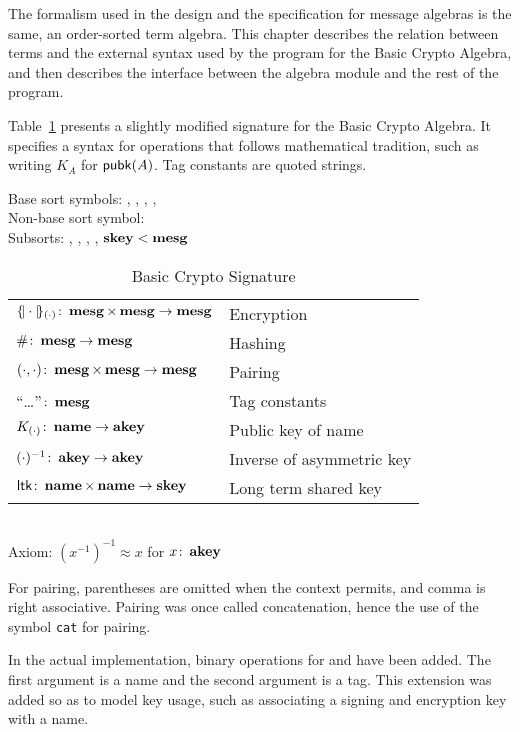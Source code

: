 \documentclass[12pt]{report}
\theoremstyle{definition}
\begin{document}
The formalism used in the design and the specification for message
algebras is the same, an order-sorted term algebra.  This chapter
describes the relation between terms and the external syntax used by
the {\cpsa} program for the Basic Crypto Algebra, and then describes
the interface between the algebra module and the rest of the program.

Table~\ref{tab:bca} presents a slightly modified signature for the
Basic Crypto Algebra.  It specifies a syntax for operations that
follows mathematical tradition, such as writing $K_A$ for
$\operatorname{\mathsf{pubk}}(A)$.  Tag constants are quoted strings.

\begin{table}
\begin{center}
Base sort symbols: , , , ,
\\
Non-base sort symbol:  \\[1ex]
Subsorts: , , , ,
$\operatorname{\mathbf{skey}}<\operatorname{\mathbf{mesg}}$\\[1ex]
\begin{tabular}{@{}ll}
$\{\!|\cdot|\!\}_{(\cdot)}\colon\operatorname{\mathbf{mesg}}\times\operatorname{\mathbf{mesg}}\rightarrow\operatorname{\mathbf{mesg}}$
&Encryption\\
$\#\colon\operatorname{\mathbf{mesg}}\rightarrow\operatorname{\mathbf{mesg}}$
&Hashing\\
$(\cdot,\cdot)\colon\operatorname{\mathbf{mesg}}\times\operatorname{\mathbf{mesg}}\rightarrow\operatorname{\mathbf{mesg}}$
&Pairing\\
``\ldots''$\colon\operatorname{\mathbf{mesg}}$& Tag constants\\
$K_{(\cdot)}\colon\operatorname{\mathbf{name}}\rightarrow\operatorname{\mathbf{akey}}$
&Public key of name\\
$(\cdot)^{-1}\colon\operatorname{\mathbf{akey}}\rightarrow\operatorname{\mathbf{akey}}$
&Inverse of asymmetric key\\
$\operatorname{\mathsf{ltk}}\colon\operatorname{\mathbf{name}}\times\operatorname{\mathbf{name}}\rightarrow\operatorname{\mathbf{skey}}$
& Long term shared key
\end{tabular}\\[1ex]
Axiom: $(x^{-1})^{-1}\approx x$ for $x\colon\operatorname{\mathbf{akey}}$\\[1ex]
\caption{Basic Crypto Signature}\label{tab:bca}
\end{center}
\end{table}

For pairing, parentheses are omitted when the context permits, and
comma is right associative.  Pairing was once called concatenation,
hence the use of the symbol \texttt{cat} for pairing.

In the actual implementation, binary operations for  and
 have been added.  The first argument is a name and the
second argument is a tag.  This extension was added so as to model key
usage, such as associating a signing and encryption key with a name.
\end{document}
